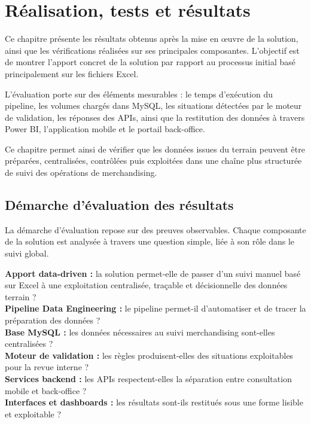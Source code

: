 \chapter{Réalisation, tests et résultats}

Ce chapitre présente les résultats obtenus après la mise en œuvre de la solution, ainsi que les vérifications réalisées sur ses principales composantes. L’objectif est de montrer l’apport concret de la solution par rapport au processus initial basé principalement sur les fichiers Excel.

L’évaluation porte sur des éléments mesurables : le temps d’exécution du pipeline, les volumes chargés dans MySQL, les situations détectées par le moteur de validation, les réponses des APIs, ainsi que la restitution des données à travers Power BI, l’application mobile et le portail back-office.

Ce chapitre permet ainsi de vérifier que les données issues du terrain peuvent être préparées, centralisées, contrôlées puis exploitées dans une chaîne plus structurée de suivi des opérations de merchandising.

\section{Démarche d’évaluation des résultats}

La démarche d’évaluation repose sur des preuves observables. Chaque composante de la solution est analysée à travers une question simple, liée à son rôle dans le suivi global.

\begin{tcolorbox}[
    colback=gray!4,
    colframe=black!60,
    title=\textbf{Questions d’évaluation retenues},
    fonttitle=\bfseries,
    arc=2mm,
    boxrule=0.6pt,
    left=6pt,
    right=6pt,
    top=6pt,
    bottom=6pt
]
\textbf{Apport data-driven :} la solution permet-elle de passer d’un suivi manuel basé sur Excel à une exploitation centralisée, traçable et décisionnelle des données terrain ?\\[0.35em]
\textbf{Pipeline Data Engineering :} le pipeline permet-il d’automatiser et de tracer la préparation des données ?\\[0.35em]
\textbf{Base MySQL :} les données nécessaires au suivi merchandising sont-elles centralisées ?\\[0.35em]
\textbf{Moteur de validation :} les règles produisent-elles des situations exploitables pour la revue interne ?\\[0.35em]
\textbf{Services backend :} les APIs respectent-elles la séparation entre consultation mobile et back-office ?\\[0.35em]
\textbf{Interfaces et dashboards :} les résultats sont-ils restitués sous une forme lisible et exploitable ?
\end{tcolorbox}

